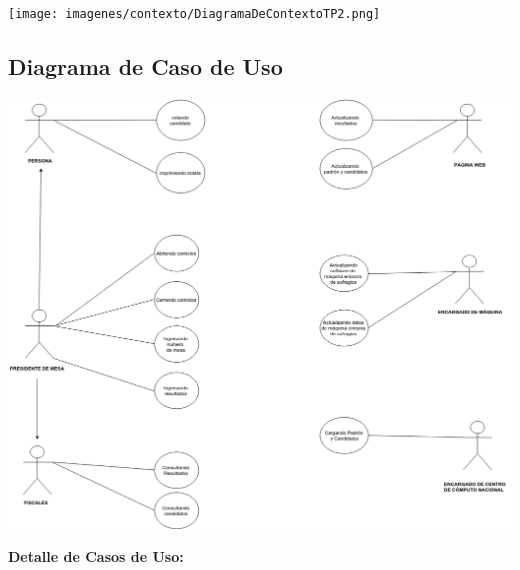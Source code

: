\documentclass[spanish, 10pt,a4paper]{article}
\numberwithin{equation}{section} %
\begin{document}
\vspace{\baselineskip}
    \begin{center}
                \texttt{[image: imagenes/contexto/DiagramaDeContextoTP2.png]}
                \\
                \vspace{1pt}
                \footnotesize\textit{}
        \end{center}
\vspace{\baselineskip}


\subsection{Diagrama de Caso de Uso}

\vspace{\baselineskip}
    \begin{center}
                \includegraphics[scale=0.40]{imagenes/CasosDeUso.png}
                \\
                \vspace{1pt}
                \footnotesize\textit{}
        \end{center}
\vspace{\baselineskip}

\newpage

\noindent\textbf{Detalle de Casos de Uso:}\\
\end{document}
